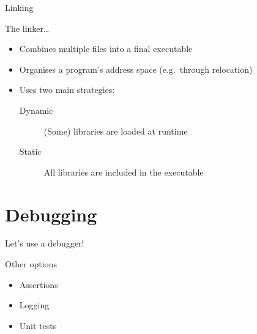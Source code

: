 \begin{frame}{Linking}
    \begin{block}{The linker\ldots}
        \begin{itemize}
            \item Combines multiple files into a final executable
            \item Organises a program's address space (e.g.\ through relocation)
            \item Uses two main strategies:
                  \begin{description}
                      \item[Dynamic] (Some) libraries are loaded at runtime
                      \item[Static]  All libraries are included in the
                                     executable
                  \end{description}
        \end{itemize}
    \end{block}
\end{frame}

\section{Debugging}

\begin{frame}
    \vfill
    \begin{center}
        {\Large%
         Let's use a debugger!}
    \end{center}
    \vfill
\end{frame}

\begin{frame}{Other options}
    \begin{itemize}
        \item Assertions
        \item Logging
        \item Unit tests
    \end{itemize}
\end{frame}




